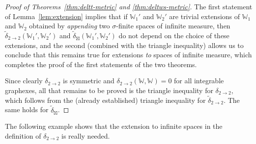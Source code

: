 \documentclass{amsart}
\numberwithin{equation}{section}
\numberwithin{figure}{section}
\theoremstyle{definition}
\theoremstyle{remark}
\newcommand{\jbl}{{\boxtimes}}
\newcommand{\cW}{\mathbb{W}}
\newcommand{\deltt}{\delta_{2\to 2}}
\def\tdel22{{\widetilde{\delta}}_{2\to 2}}
\def\tdeljbl{\widetilde\delta_{\jbl}}
\begin{document}
\begin{proof}[Proof of Theorems~\ref{thm:deltt-metric} and \ref{thm:deltws-metric}]
The first statement of Lemma~\ref{lem:extension} implies that if $\cW_1'$ and
$\cW_2'$ are trivial extensions of $\cW_1$ and $\cW_2$ obtained by
\emph{appending} two $\sigma$-finite spaces of infinite measure, then
$\tdel22(\cW_1',\cW_2')$ and $\tdeljbl(\cW_1',\cW_2')$ do not depend on the
choice of these extensions, and the second (combined with the triangle
inequality) allows us to conclude that this remains true for extensions
\emph{to} spaces of infinite measure, which completes the proof of the first
statements of the two theorems.

Since clearly $\deltt$ is symmetric and $\deltt(\cW,\cW)=0$ for all
integrable graphexes, all that remains to be proved is the triangle
inequality for $\deltt$, which follows from the (already established)
triangle inequality for $\tdel22$. The same holds for $\tdeljbl$.
\end{proof}

The following example shows that the extension to infinite spaces in the
definition of $\deltt$ is really needed.
\end{document}
